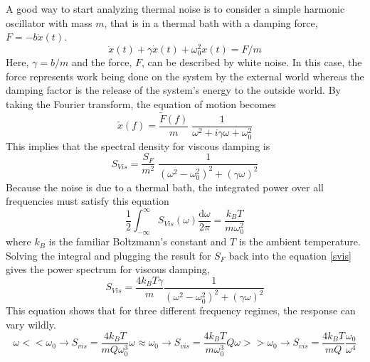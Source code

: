 		A good way to start analyzing thermal noise is to consider a simple harmonic oscillator with mass $m$, that is in a thermal bath with a damping force, $F=-b\dot{x}(t)$.
		\begin{equation}
		\ddot{x}(t) + \gamma \dot{x}(t) + \omega_{0}^2 x(t) = F/m
 		\end{equation}
		Here, $\gamma = b/m$ and the force, $F$, can be described by white noise.  In this case, the force represents work being done on the system by the external world whereas the damping factor is the release of the system's energy to the outside world.  By taking the Fourier transform, the equation of motion becomes
		\begin{equation}\label{harmonic}
		\tilde{x}(f) = \frac{\tilde{F}(f)}{m} \; \frac{1}{\omega^2 +i \gamma \omega + \omega_{0}^2} 
		\end{equation}
		This implies that the spectral density for viscous damping is
		\begin{equation}\label{svis}
		S_{Vis} = \frac{S_F}{m^2} \; \frac{1}{(\omega^2 -\omega_{0}^2)^2 + (\gamma\omega)^2}
		\end{equation}
		Because the noise is due to a thermal bath, the integrated power over all frequencies must satisfy this equation
		\begin{equation}
		\frac{1}{2} \int_{-\infty}^{\infty} S_{Vis} (\omega) \frac{\text{d}\omega}{2\pi} = \frac{k_B T}{m\omega_{0}^2}
		\end{equation}
		where $k_B$ is the familiar Boltzmann's constant and $T$ is the ambient temperature.  Solving the integral and plugging the result for $S_F$ back into the equation \ref{svis} gives the power spectrum for viscous damping,
		\begin{equation}\label{vis}
		S_{Vis} = \frac{4k_B T \gamma}{m} \frac{1}{(\omega^2 - \omega_{0}^2)^2 + (\gamma\omega)^2}
		\end{equation}
		This equation shows that for three different frequency regimes, the response can vary wildly.
		\begin{subequations}
			\begin{equation}
			\omega<< \omega_{0} \rightarrow S_{vis} = \frac{4k_B T}{m Q \omega_{0}^3}
			\end{equation}
			\begin{equation}
			\omega \approx \omega_{0} \rightarrow S_{vis} = \frac{4k_B T}{m \omega_{0}^3} Q
			\end{equation}
			\begin{equation}
			\omega >> \omega_{0} \rightarrow S_{vis} = \frac{4k_B T}{m Q} \frac{\omega_0}{\omega^4} 
			\end{equation}
		\end{subequations}
